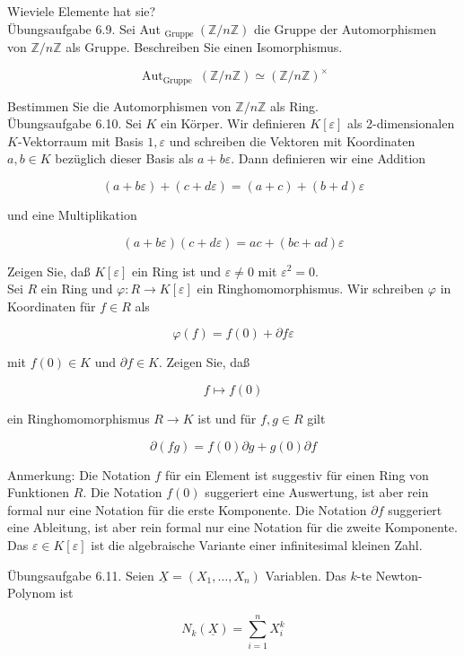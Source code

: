 \documentclass[10pt, letterpaper]{article}
\begin{document}
Wieviele Elemente hat sie?\\
Übungsaufgabe 6.9. Sei Aut ${ }_{\text {Gruppe }}(\mathbb{Z} / n \mathbb{Z})$ die Gruppe der Automorphismen von $\mathbb{Z} / n \mathbb{Z}$ als Gruppe. Beschreiben Sie einen Isomorphismus.

$$
\operatorname{Aut}_{\text {Gruppe }}(\mathbb{Z} / n \mathbb{Z}) \simeq(\mathbb{Z} / n \mathbb{Z})^{\times}
$$

Bestimmen Sie die Automorphismen von $\mathbb{Z} / n \mathbb{Z}$ als Ring.\\
Übungsaufgabe 6.10. Sei $K$ ein Körper. Wir definieren $K[\varepsilon]$ als 2-dimensionalen $K$-Vektorraum mit Basis $1, \varepsilon$ und schreiben die Vektoren mit Koordinaten $a, b \in K$ bezüglich dieser Basis als $a+b \varepsilon$. Dann definieren wir eine Addition

$$
(a+b \varepsilon)+(c+d \varepsilon)=(a+c)+(b+d) \varepsilon
$$

und eine Multiplikation

$$
(a+b \varepsilon)(c+d \varepsilon)=a c+(b c+a d) \varepsilon
$$

Zeigen Sie, daß $K[\varepsilon]$ ein Ring ist und $\varepsilon \neq 0$ mit $\varepsilon^{2}=0$.\\
Sei $R$ ein Ring und $\varphi: R \rightarrow K[\varepsilon]$ ein Ringhomomorphismus. Wir schreiben $\varphi$ in Koordinaten für $f \in R$ als

$$
\varphi(f)=f(0)+\partial f \varepsilon
$$

mit $f(0) \in K$ und $\partial f \in K$. Zeigen Sie, daß

$$
f \mapsto f(0)
$$

ein Ringhomomorphismus $R \rightarrow K$ ist und für $f, g \in R$ gilt

$$
\partial(f g)=f(0) \partial g+g(0) \partial f
$$

Anmerkung: Die Notation $f$ für ein Element ist suggestiv für einen Ring von Funktionen $R$. Die Notation $f(0)$ suggeriert eine Auswertung, ist aber rein formal nur eine Notation für die erste Komponente. Die Notation $\partial f$ suggeriert eine Ableitung, ist aber rein formal nur eine Notation für die zweite Komponente. Das $\varepsilon \in K[\varepsilon]$ ist die algebraische Variante einer infinitesimal kleinen Zahl.

Übungsaufgabe 6.11. Seien $\underline{X}=\left(X_{1}, \ldots, X_{n}\right)$ Variablen. Das $k$-te Newton-Polynom ist

$$
N_{k}(\underline{X})=\sum_{i=1}^{n} X_{i}^{k}
$$
\end{document}
